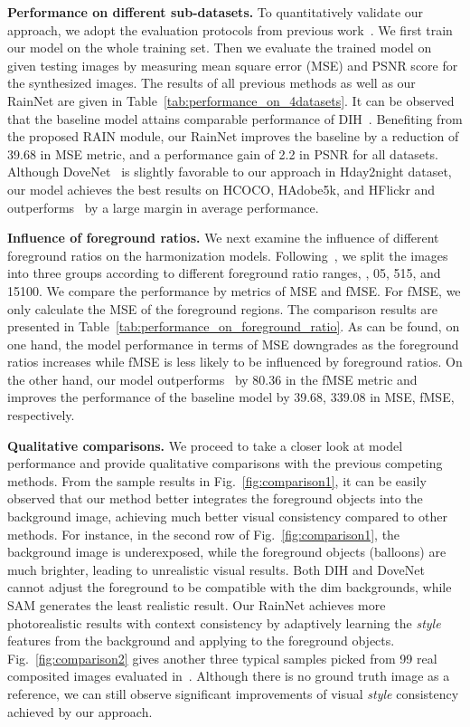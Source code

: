 \documentclass[final]{cvpr}
\begin{document}
\noindent
\textbf{Performance on different sub-datasets.} To quantitatively validate our approach, we adopt the evaluation protocols from previous work~\cite{cong2020dovenet,tsai2017deep,cun2020improving}. We first train our model on the whole training set. Then we evaluate the trained model on given testing images by measuring mean square error (MSE) and PSNR score for the synthesized images. The results of all previous methods as well as our RainNet are given in Table~\ref{tab:performance_on_4datasets}. It can be observed that the baseline model attains comparable performance of DIH~\cite{tsai2017deep}. Benefiting from the proposed RAIN module, our RainNet improves the baseline by a reduction of 39.68 in MSE metric, and a performance gain of 2.2 in PSNR for all datasets. Although DoveNet~\cite{cong2020dovenet} is slightly favorable to our approach in Hday2night dataset, our model achieves the best results on HCOCO, HAdobe5k, and HFlickr and outperforms~\cite{cong2020dovenet} by a large margin in average performance. 


\noindent
\textbf{Influence of foreground ratios.} We next examine the influence of different foreground ratios on the harmonization models. Following~\cite{cong2020dovenet}, we split the images into three groups according to different foreground ratio ranges, \ie, 05, 515, and 15100. We compare the performance by metrics of MSE and fMSE. For fMSE, we only calculate the MSE of the foreground regions. The comparison results are presented in Table~\ref{tab:performance_on_foreground_ratio}. As can be found, on one hand, the model performance in terms of MSE downgrades as the foreground ratios increases while fMSE is less likely to be influenced by foreground ratios. On the other hand, our model outperforms~\cite{cong2020dovenet} by 80.36 in the fMSE metric and improves the performance of the baseline model by 39.68, 339.08 in MSE, fMSE, respectively. 


\noindent
\textbf{Qualitative comparisons.} We proceed to take a closer look at model performance and provide qualitative comparisons with the previous competing methods. From the sample results in Fig.~\ref{fig:comparison1}, it can be easily observed that our method better integrates the foreground objects into the background image, achieving much better visual consistency compared to other methods. For instance, in the second row of Fig.~\ref{fig:comparison1}, the background image is underexposed, while the foreground objects (balloons) are much brighter, leading to unrealistic visual results. Both DIH and DoveNet cannot adjust the foreground to be compatible with the dim backgrounds, while SAM generates the least realistic result. Our RainNet achieves more photorealistic results with context consistency by adaptively learning the \emph{style} features from the background and applying to the foreground objects. Fig.~\ref{fig:comparison2} gives another three typical samples picked from 99 real composited images evaluated in~\cite{tsai2017deep}. Although there is no ground truth image as a reference, we can still observe significant improvements of visual \emph{style} consistency achieved by our approach. 
\end{document}
